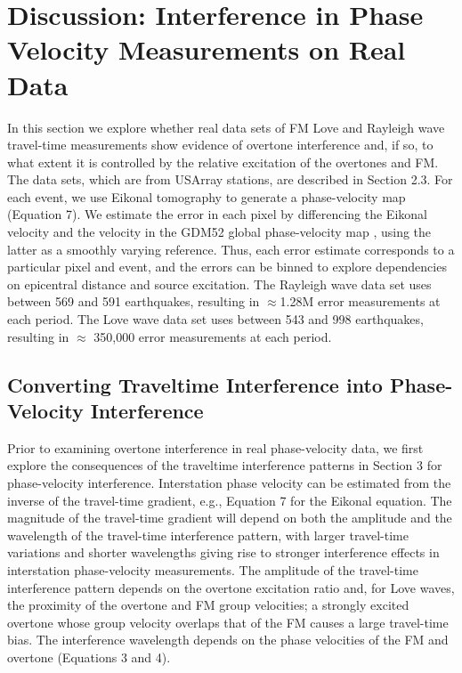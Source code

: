 \documentclass[extra,mreferee]{gji}
\begin{document}
\section{Discussion: Interference in Phase Velocity Measurements on Real Data}
In this section we explore whether real data sets of FM Love and Rayleigh wave travel-time measurements show evidence of overtone interference and, if so, to what extent it is controlled by the relative excitation of the overtones and FM. The data sets, which are from USArray stations, are described in Section 2.3. For each event, we use Eikonal tomography to generate a phase-velocity map (Equation 7). We estimate the error in each pixel by differencing the Eikonal velocity and the velocity in the GDM52 global phase-velocity map \citep{ekstrom2011global}, using the latter as a smoothly varying reference. Thus, each error estimate corresponds to a particular pixel and event, and the errors can be binned to explore dependencies on epicentral distance and source excitation. The Rayleigh wave data set uses between 569 and 591 earthquakes, resulting in $\approx$1.28M error measurements at each period. The Love wave data set uses between 543 and 998 earthquakes, resulting in $\approx$ 350,000 error measurements at each period.

\subsection{Converting Traveltime Interference into Phase-Velocity Interference} 

Prior to examining overtone interference in real phase-velocity data, we first explore the consequences of the traveltime interference patterns in Section 3 for phase-velocity interference. Interstation phase velocity can be estimated from the inverse of the travel-time gradient, e.g., Equation 7 for the Eikonal equation. The magnitude of the travel-time gradient will depend on both the amplitude and the wavelength of the travel-time interference pattern, with larger travel-time variations and shorter wavelengths giving rise to stronger interference effects in interstation phase-velocity measurements. The amplitude of the travel-time interference pattern depends on the overtone excitation ratio and, for Love waves, the proximity of the overtone and FM group velocities; a strongly excited overtone whose group velocity overlaps that of the FM causes a large travel-time bias. The interference wavelength depends on the phase velocities of the FM and overtone (Equations 3 and 4).
\end{document}
